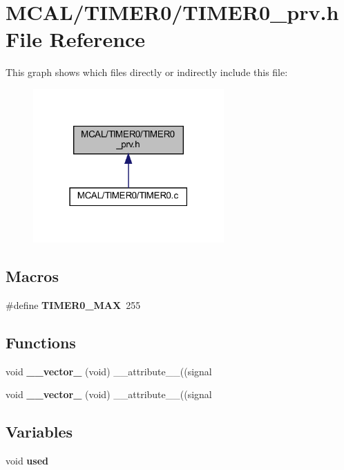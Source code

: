 \section{M\+C\+A\+L/\+T\+I\+M\+E\+R0/\+T\+I\+M\+E\+R0\+\_\+prv.h File Reference}
\label{_t_i_m_e_r0__prv_8h}
This graph shows which files directly or indirectly include this file\+:\nopagebreak
\begin{figure}[H]
\begin{center}
\leavevmode
\includegraphics[width=207pt]{_t_i_m_e_r0__prv_8h__dep__incl}
\end{center}
\end{figure}
\subsection*{Macros}
\begin{DoxyCompactItemize}
\item 
\#define \textbf{ T\+I\+M\+E\+R0\+\_\+\+M\+AX}~255
\end{DoxyCompactItemize}
\subsection*{Functions}
\begin{DoxyCompactItemize}
\item 
void \textbf{ \+\_\+\+\_\+vector\+\_} (void) \+\_\+\+\_\+attribute\+\_\+\+\_\+((signal
\item 
void \textbf{ \+\_\+\+\_\+vector\+\_} (void) \+\_\+\+\_\+attribute\+\_\+\+\_\+((signal
\end{DoxyCompactItemize}
\subsection*{Variables}
\begin{DoxyCompactItemize}
\item 
void \textbf{ used}
\end{DoxyCompactItemize}


